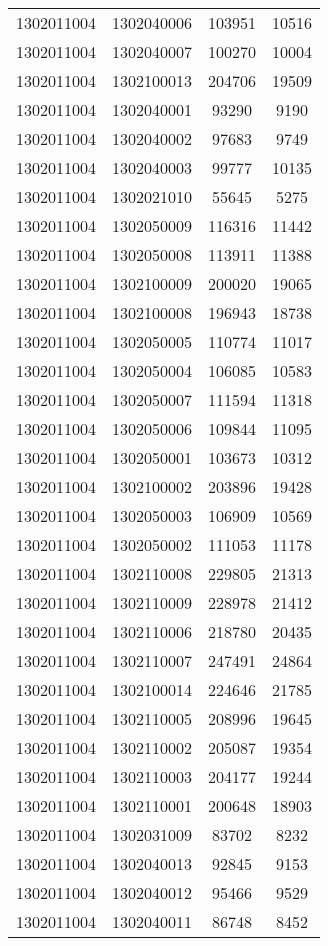 \begin{longtable}{llcc}
1302011004 & 1302040006 & 103951 & 10516\\
1302011004 & 1302040007 & 100270 & 10004\\
1302011004 & 1302100013 & 204706 & 19509\\
1302011004 & 1302040001 & 93290 & 9190\\
1302011004 & 1302040002 & 97683 & 9749\\
1302011004 & 1302040003 & 99777 & 10135\\
1302011004 & 1302021010 & 55645 & 5275\\
1302011004 & 1302050009 & 116316 & 11442\\
1302011004 & 1302050008 & 113911 & 11388\\
1302011004 & 1302100009 & 200020 & 19065\\
1302011004 & 1302100008 & 196943 & 18738\\
1302011004 & 1302050005 & 110774 & 11017\\
1302011004 & 1302050004 & 106085 & 10583\\
1302011004 & 1302050007 & 111594 & 11318\\
1302011004 & 1302050006 & 109844 & 11095\\
1302011004 & 1302050001 & 103673 & 10312\\
1302011004 & 1302100002 & 203896 & 19428\\
1302011004 & 1302050003 & 106909 & 10569\\
1302011004 & 1302050002 & 111053 & 11178\\
1302011004 & 1302110008 & 229805 & 21313\\
1302011004 & 1302110009 & 228978 & 21412\\
1302011004 & 1302110006 & 218780 & 20435\\
1302011004 & 1302110007 & 247491 & 24864\\
1302011004 & 1302100014 & 224646 & 21785\\
1302011004 & 1302110005 & 208996 & 19645\\
1302011004 & 1302110002 & 205087 & 19354\\
1302011004 & 1302110003 & 204177 & 19244\\
1302011004 & 1302110001 & 200648 & 18903\\
1302011004 & 1302031009 & 83702 & 8232\\
1302011004 & 1302040013 & 92845 & 9153\\
1302011004 & 1302040012 & 95466 & 9529\\
1302011004 & 1302040011 & 86748 & 8452\\

\end{longtable}
